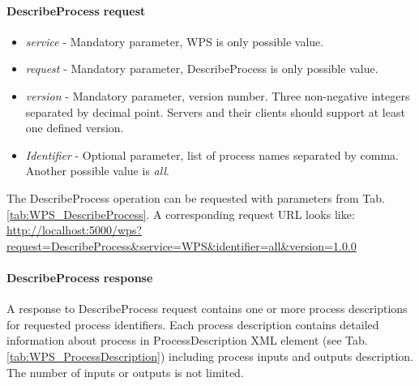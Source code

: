\paragraph{DescribeProcess request}
\begin{itemize}
\item\textit{service} - Mandatory parameter, WPS is only possible value.
\item\textit{request} - Mandatory parameter, DescribeProcess is only possible value.
\item\textit{version} - Mandatory parameter, version number. Three non-negative integers separated by decimal point. Servers and
their clients should support at least one defined version.
\item\textit{Identifier} - Optional parameter, list of process names separated by comma. Another possible value is \textit{all}.
\end{itemize}

The DescribeProcess operation can be requested with parameters from Tab. \ref{tab:WPS_DescribeProcess}. A corresponding
request URL looks like: \url{http://localhost:5000/wps?request=DescribeProcess&service=WPS&identifier=all&version=1.0.0}

\paragraph{DescribeProcess response}
\label{para:DesribeProc_response}

A response to DescribeProcess request contains one or more process descriptions for requested process identifiers.
Each
process description contains detailed information about process in ProcessDescription XML element (see Tab. 
\ref{tab:WPS_ProcessDescription})
including process inputs and outputs description. The number of inputs or outputs is not limited.

